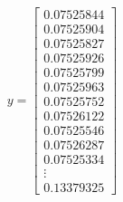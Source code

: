 \documentclass[11pt]{extarticle}
\begin{document}
	\begin{align}
		y = \begin{bmatrix}
			0.07525844 \\
			0.07525904 \\
			0.07525827 \\
			0.07525926 \\
			0.07525799 \\
			0.07525963 \\
			0.07525752 \\
			0.07526122 \\
			0.07525546 \\
			0.07526287 \\
			0.07525334 \\
			\vdots \\
			0.13379325 
		\end{bmatrix}
	\end{align}
	
\end{document}

